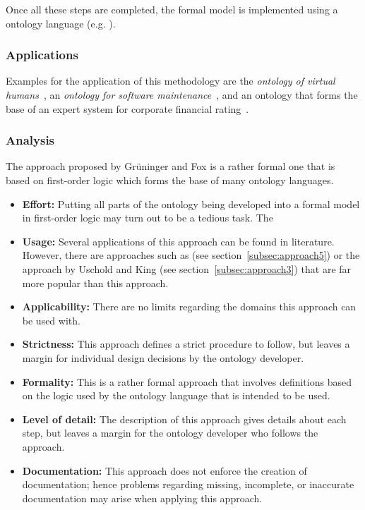 Once all these steps are completed, the formal model is implemented using a ontology language (e.g. ).

\subsubsection{Applications}

Examples for the application of this methodology are the \emph{ontology of virtual humans}~\cite{tove_example1}, an \emph{ontology for software maintenance}~\cite{tove_example2}, and an ontology that forms the base of an expert system for corporate financial rating~\cite{tove_example3}.

\subsubsection{Analysis}

The approach proposed by Grüninger and Fox is a rather formal one that is based on first-order logic which forms the base of many ontology languages.

\begin{itemize}
  \item \textbf{Effort:} Putting all parts of the ontology being developed into a formal model in first-order logic may turn out to be a tedious task. The 
  
  \item \textbf{Usage:} Several applications of this approach can be found in literature. However, there are approaches such as \methontology (see section~\ref{subsec:approach5}) or the approach by Uschold and King (see section~\ref{subsec:approach3}) that are far more popular than this approach.
  
  \item \textbf{Applicability:} There are no limits regarding the domains this approach can be used with.
  
  \item \textbf{Strictness:} This approach defines a strict procedure to follow, but leaves a margin for individual design decisions by the ontology developer.
  
  \item \textbf{Formality:} This is a rather formal approach that involves definitions based on the logic used by the ontology language that is intended to be used.
  
  \item \textbf{Level of detail:} The description of this approach gives details about each step, but leaves a margin for the ontology developer who follows the approach.
  
  \item \textbf{Documentation:} This approach does not enforce the creation of documentation; hence problems regarding missing, incomplete, or inaccurate documentation may arise when applying this approach.
\end{itemize}

